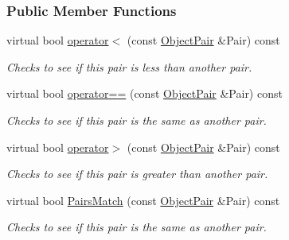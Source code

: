 \subsubsection*{Public Member Functions}
\begin{DoxyCompactItemize}
\item 
virtual bool \hyperlink{classMezzanine_1_1ObjectPair_ae0f6ec9e02fa5e585988d8715f61eccf}{operator$<$} (const \hyperlink{classMezzanine_1_1ObjectPair}{ObjectPair} \&Pair) const 
\begin{DoxyCompactList}\small\item\em Checks to see if this pair is less than another pair. \item\end{DoxyCompactList}\item 
virtual bool \hyperlink{classMezzanine_1_1ObjectPair_a9ef3a1e9a43bd16c0cd9e9db5713dd87}{operator==} (const \hyperlink{classMezzanine_1_1ObjectPair}{ObjectPair} \&Pair) const 
\begin{DoxyCompactList}\small\item\em Checks to see if this pair is the same as another pair. \item\end{DoxyCompactList}\item 
virtual bool \hyperlink{classMezzanine_1_1ObjectPair_a6dd31a9481a2e6fc8893241f1481173c}{operator$>$} (const \hyperlink{classMezzanine_1_1ObjectPair}{ObjectPair} \&Pair) const 
\begin{DoxyCompactList}\small\item\em Checks to see if this pair is greater than another pair. \item\end{DoxyCompactList}\item 
virtual bool \hyperlink{classMezzanine_1_1ObjectPair_aacdc52e1c01f8c4a93323443dfde2059}{PairsMatch} (const \hyperlink{classMezzanine_1_1ObjectPair}{ObjectPair} \&Pair) const 
\begin{DoxyCompactList}\small\item\em Checks to see if this pair is the same as another pair. \item\end{DoxyCompactList}\end{DoxyCompactItemize}
